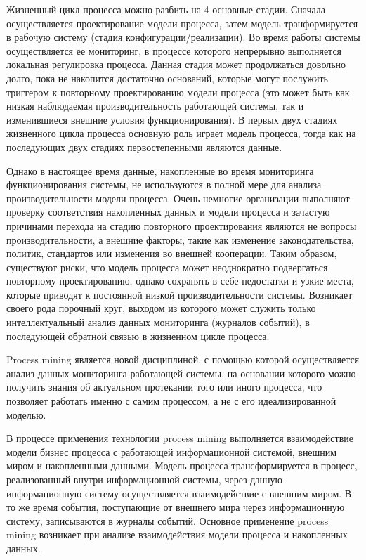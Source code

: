\documentclass[
11pt,%
tightenlines,%
twoside,%
onecolumn,%
nofloats,%
nobibnotes,%
nofootinbib,%
superscriptaddress,%
noshowpacs,%
centertags]%
{revtex4}
\begin{document}
Жизненный цикл процесса можно разбить на 4 основные стадии.
Сначала осуществляется проектирование модели процесса, затем модель транформируется в рабочую систему (стадия конфигурации/реализации).
Во время работы системы осуществляется ее мониторинг, в процессе которого непрерывно выполняется локальная регулировка процесса.
Данная стадия может продолжаться довольно долго, пока не накопится достаточно оснований, которые могут послужить триггером к повторному проектированию модели процесса (это может быть как низкая наблюдаемая производительность работающей системы, так и изменившиеся внешние условия функционирования).
В первых двух стадиях жизненного цикла процесса основную роль играет модель процесса, тогда как на последующих двух стадиях первостепенными являются данные. 

Однако в настоящее время данные, накопленные во время мониторинга функционирования системы, не используются в полной мере для анализа производительности модели процесса.
Очень немногие организации выполняют проверку соответствия накопленных данных и модели процесса и зачастую причинами перехода на стадию повторного проектирования являются не вопросы производительности, а внешние факторы, такие как изменение законодательства, политик, стандартов или изменения во внешней кооперации.
Таким образом, существуют риски, что модель процесса может неоднократно подвергаться повторному проектированию, однако сохранять в себе недостатки и узкие места, которые приводят к постоянной низкой производительности системы.
Возникает своего рода порочный круг, выходом из которого может служить только интеллектуальный анализ данных мониторинга (журналов событий), в последующей обратной связью в жизненном цикле процесса.

Process mining является новой дисциплиной, с помощью которой осуществляется анализ данных мониторинга работающей системы, на основании которого можно получить знания об актуальном протекании того или иного процесса, что позволяет работать именно с самим процессом, а не с его идеализированной моделью.

В процессе применения технологии process mining выполняется взаимодействие модели бизнес процесса с работающей информационной системой, внешним миром и накопленными данными.
Модель процесса трансформируется в процесс, реализованный внутри информационной системы, через данную информационную систему осуществляется взаимодействие с внешним миром.
В то же время события, поступающие от внешнего мира через информационную систему, записываются в журналы событий. Основное применение process mining возникает при анализе взаимодействия модели процесса и накопленных данных.
\end{document}
